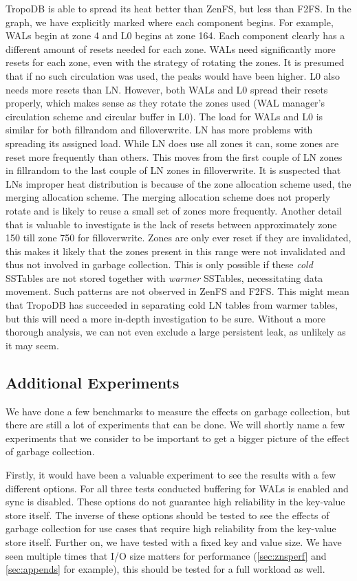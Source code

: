TropoDB is able to spread its heat better than ZenFS, but less than F2FS. In the graph, we have explicitly marked where each component begins. For example, WALs begin at zone 4 and L0 begins at zone 164. Each component clearly has a different amount of resets needed for each zone. WALs need significantly more resets for each zone, even with the strategy of rotating the zones. It is presumed that if no such circulation was used, the peaks would have been higher. L0 also needs more resets than LN. However, both WALs and L0 spread their resets properly, which makes sense as they rotate the zones used (WAL manager's circulation scheme and circular buffer in L0). The load for WALs and L0 is similar for both fillrandom and filloverwrite. LN has more problems with spreading its assigned load. While LN does use all zones it can, some zones are reset more frequently than others. This moves from the first couple of LN zones in fillrandom to the last couple of LN zones in filloverwrite. It is suspected that LNs improper heat distribution is because of the zone allocation scheme used, the merging allocation scheme. The merging allocation scheme does not properly rotate and is likely to reuse a small set of zones more frequently. Another detail that is valuable to investigate is the lack of resets between approximately zone 150 till zone 750 for filloverwrite. Zones are only ever reset if they are invalidated, this makes it likely that the zones present in this range were not invalidated and thus not involved in garbage collection. This is only possible if these \textit{cold} SSTables are not stored together with \textit{warmer} SSTables, necessitating data movement. Such patterns are not observed in ZenFS and F2FS. This might mean that TropoDB has succeeded in separating cold LN tables from warmer tables, but this will need a more in-depth investigation to be sure. Without a more thorough analysis, we can not even exclude a large persistent leak, as unlikely as it may seem.        

\subsection{Additional Experiments}
We have done a few benchmarks to measure the effects on garbage collection, but there are still a lot of experiments that can be done. We will shortly name a few experiments that we consider to be important to get a bigger picture of the effect of garbage collection. 

Firstly, it would have been a valuable experiment to see the results with a few different options. For all three tests conducted buffering for WALs is enabled and sync is disabled. These options do not guarantee high reliability in the key-value store itself. The inverse of these options should be tested to see the effects of garbage collection for use cases that require high reliability from the key-value store itself. Further on, we have tested with a fixed key and value size. We have seen multiple times that I/O size matters for performance (\autoref{sec:znsperf} and \autoref{sec:appends} for example), this should be tested for a full workload as well.

